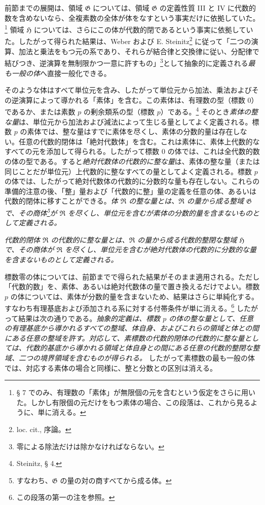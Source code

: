 \documentclass[11pt]{article}
\begin{document}
前節までの展開は、領域 $\mathfrak G$ については、領域 $\mathfrak G$ の定義性質 III と IV に代数的数を含めないなら、全複素数の全体が体をなすという事実だけに依拠していた。\footnote{§ 7 でのみ、有理数の「素体」が無限個の元を含むという仮定をさらに用いた。しかし有限個の元だけをもつ素体の場合、この段落は、これから見るように、単に消える。} 領域 $\mathfrak H$ については、さらにこの体が代数的閉であるという事実に依拠していた。したがって得られた結果は、Weber および E. Steinitz\footnote{loc. cit., 序論。} に従って「二つの演算、加法と乗法をもつ元の系であり、それらが結合律と交換律に従い、分配律で結びつき、逆演算を無制限かつ一意に許すもの」\footnote{零による除法だけは除かなければならない。}として抽象的に定義される\emph{最も一般の体}へ直接一般化できる。

そのような体はすべて単位元を含み、したがって単位元から加法、乗法およびその逆演算によって導かれる「素体」を含む。この素体は、有理数の型（標数 $0$）であるか、または素数 $p$ の剰余類系の型（標数 $p$）である。\footnote{Steinitz, § 4.} そのとき\emph{素体の整な量}は、単位元から加法および減法によって生じる量としてよく定義される。標数 $p$ の素体では、整な量はすでに素体を尽くし、素体の分数的量は存在しない。任意の代数的閉体は「絶対代数体」を含む。これは素体に、素体上代数的なすべての元を添加して得られる。したがって標数 $0$ の体では、これは全代数的数の体の型である。すると\emph{絶対代数体の代数的に整な量}は、素体の整な量（または同じことだが単位元）上代数的に整なすべての量としてよく定義される。標数 $p$ の体では、したがって絶対代数体の代数的に分数的な量も存在しない。これらの準備的注意の後、「整」量および「代数的に整」量の定義を任意の体、あるいは代数的閉体に移すことができる。\emph{体 $\mathfrak R$ の整な量とは、$\mathfrak R$ の量から成る整域 $\mathfrak G$ で、その商体\footnote{すなわち、$\mathfrak G$ の量の対の商すべてから成る体。}が $\mathfrak R$ を尽くし、単位元を含むが素体の分数的量を含まないものとして定義される。}

\emph{代数的閉体 $\mathfrak R$ の代数的に整な量とは、$\mathfrak R$ の量から成る代数的整閉な整域 $\mathfrak H$ で、その商体が $\mathfrak R$ を尽くし、単位元を含むが絶対代数体の代数的に分数的な量を含まないものとして定義される。}

標数零の体については、前節までで得られた結果がそのまま適用される。ただし「代数的数」を、素体、あるいは絶対代数体の量で置き換えるだけでよい。標数 $p$ の体については、素体が分数的量を含まないため、結果はさらに単純化する。すなわち有理基底および添加される系に対する付帯条件が単に消える。\footnote{この段落の第一の注を参照。} したがって結果は次の通りである。\emph{抽象的定義は、標数 $p$ の体の整な量として、任意の有理基底から導かれるすべての整域、体自身、およびこれらの領域と体との間にある任意の整域を許す。対応して、素標数の代数的閉体の代数的に整な量としては、代数的基底から導かれる領域と体自身との間にある任意の代数的整閉な整域、二つの境界領域を含むものが得られる。} したがって素標数の最も一般の体では、対応する素体の場合と同様に、整と分数との区別は消える。
\end{document}
